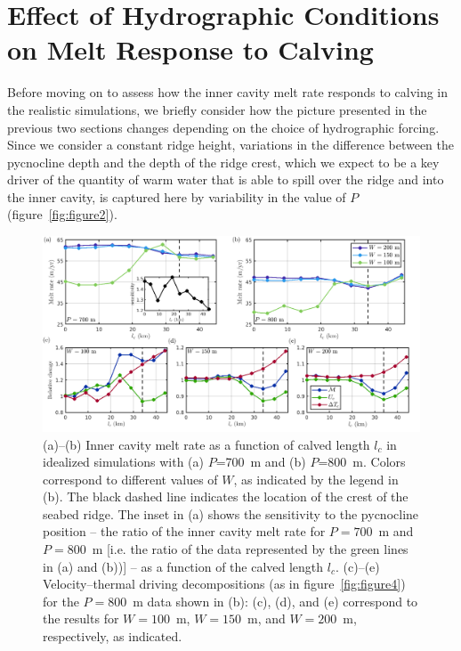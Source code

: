 \documentclass[draft]{agujournal2019}
\begin{document}
\section{Effect of Hydrographic Conditions on Melt Response to Calving}\label{S:Results:P}
Before moving on to assess how the inner cavity melt rate responds to calving in the realistic simulations, we briefly consider how the picture presented in the previous two sections changes depending on the choice of hydrographic forcing. Since we consider a constant ridge height, variations in the difference between the pycnocline depth and the depth of the ridge crest, which we expect to be a key driver of the quantity of warm water that is able to spill over the ridge and into the inner cavity, is captured here by variability in the value of $P$ (figure~\ref{fig:figure2}).

\begin{figure}
    \centering
    \includegraphics[width = \textwidth]{../make_figures/plots/figure8.png}
    \caption{(a)--(b) Inner cavity melt rate as a function of calved length $l_c$ in idealized simulations with (a) $P$=700~m and (b) $P$=800~m. Colors correspond to different values of $W$, as indicated by the legend in (b). The black dashed line indicates the location of the crest of the seabed ridge. The inset in (a) shows the sensitivity to the pycnocline position -- the ratio of the inner cavity melt rate for $P = 700$~m and $P = 800$~m [i.e. the ratio of the data represented by the green lines in (a) and (b))] -- as a function of the calved length $l_c$. (c)--(e) Velocity--thermal driving decompositions (as in figure~\ref{fig:figure4}) for the $P = 800$~m data shown in (b): (c), (d), and (e) correspond to the results for $W=100$~m, $W=150$~m, and $W=200$~m, respectively, as indicated.}
    \label{fig:figure8}
\end{figure}
\end{document}
